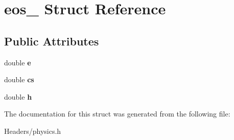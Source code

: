 \hypertarget{structeos__}{}\section{eos\+\_\+ Struct Reference}
\label{structeos__}
\subsection*{Public Attributes}
\begin{DoxyCompactItemize}
\item 
\mbox{\label{structeos___a4eaae660b31a8bdf7860af4c9cd53bb1}} 
double {\bfseries e}
\item 
\mbox{\label{structeos___adf59853414b0f6f6a9661127058ee1b4}} 
double {\bfseries cs}
\item 
\mbox{\label{structeos___a22acd1b1694e09167f093eda035427dc}} 
double {\bfseries h}
\end{DoxyCompactItemize}


The documentation for this struct was generated from the following file\+:\begin{DoxyCompactItemize}
\item 
Headers/physics.\+h\end{DoxyCompactItemize}

